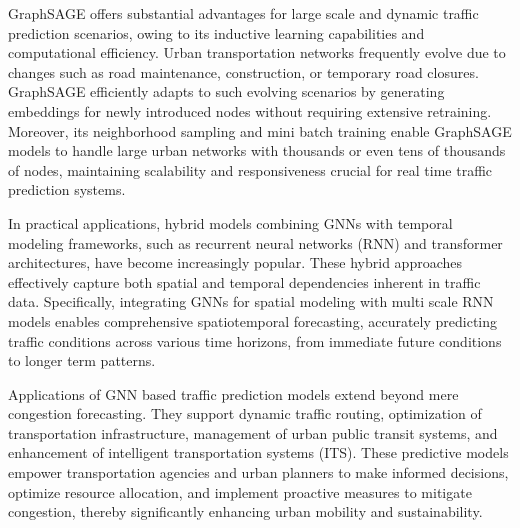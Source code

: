 \documentclass{article}
\begin{document}
GraphSAGE offers substantial advantages for large scale and dynamic traffic prediction scenarios, owing to its inductive learning capabilities and computational efficiency. Urban transportation networks frequently evolve due to changes such as road maintenance, construction, or temporary road closures. GraphSAGE efficiently adapts to such evolving scenarios by generating embeddings for newly introduced nodes without requiring extensive retraining. Moreover, its neighborhood sampling and mini batch training enable GraphSAGE models to handle large urban networks with thousands or even tens of thousands of nodes, maintaining scalability and responsiveness crucial for real time traffic prediction systems.

In practical applications, hybrid models combining GNNs with temporal modeling frameworks, such as recurrent neural networks (RNN) and transformer architectures, have become increasingly popular. These hybrid approaches effectively capture both spatial and temporal dependencies inherent in traffic data. Specifically, integrating GNNs for spatial modeling with multi scale RNN models enables comprehensive spatiotemporal forecasting, accurately predicting traffic conditions across various time horizons, from immediate future conditions to longer term patterns.

Applications of GNN based traffic prediction models extend beyond mere congestion forecasting. They support dynamic traffic routing, optimization of transportation infrastructure, management of urban public transit systems, and enhancement of intelligent transportation systems (ITS). These predictive models empower transportation agencies and urban planners to make informed decisions, optimize resource allocation, and implement proactive measures to mitigate congestion, thereby significantly enhancing urban mobility and sustainability.


\end{document}
